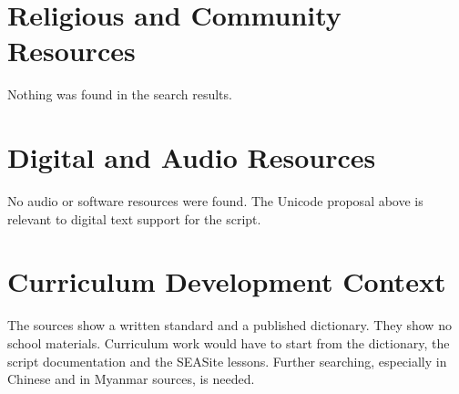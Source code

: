 \documentclass[12pt]{article}
\begin{document}
\section{Religious and Community Resources}
Nothing was found in the search results.
\section{Digital and Audio Resources}
No audio or software resources were found. The Unicode proposal above is relevant to digital text support for the script.
\section{Curriculum Development Context}
The sources show a written standard and a published dictionary. They show no school materials. Curriculum work would have to start from the dictionary, the script documentation and the SEASite lessons. Further searching, especially in Chinese and in Myanmar sources, is needed.
\end{document}
